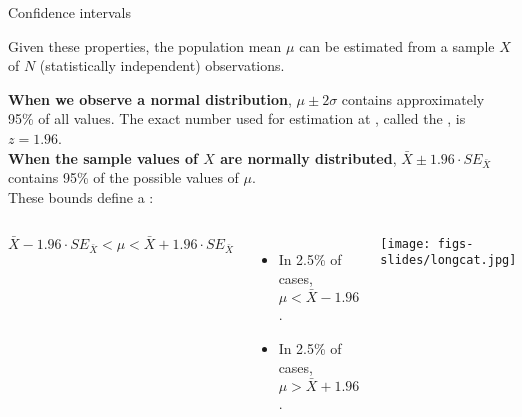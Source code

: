 \documentclass{beamer}
\begin{document}
	\begin{frame}[t]{Confidence intervals}

	Given these properties, the population mean $\mu$ can be estimated from a sample $X$ of $N$ (statistically independent) observations.\vspace{1em}

		\textbf{When we observe a normal distribution}, $\mu \pm 2\sigma$ contains approximately 95\% of all values. The exact number used for estimation at , called the , is $z = 1.96$.\\
		\vspace{1em}
\textbf{When the sample values of $X$ are normally distributed}, $\bar X \pm 1.96 \cdot SE_{\bar X}$ contains 95\% of the possible values of $\mu$.\\[1em]

These bounds define a :


	\begin{columns}[T]
		\hspace{.725em}
		$\bar{X} -1.96 \cdot SE_{\bar X} < \mu < \bar{X} + 1.96 \cdot SE_{\bar X}$	
		\begin{itemize}
			\item In 2.5\% of cases, $\mu < \bar{X} - 1.96$.
			\item In 2.5\% of cases, $\mu > \bar{X} + 1.96$.					\end{itemize}
		\vspace{-4em}
		\begin{flushright}
		\texttt{[image: figs-slides/longcat.jpg]}		
		\end{flushright}
	\end{columns}

	
	\end{frame}
	
\end{document}
